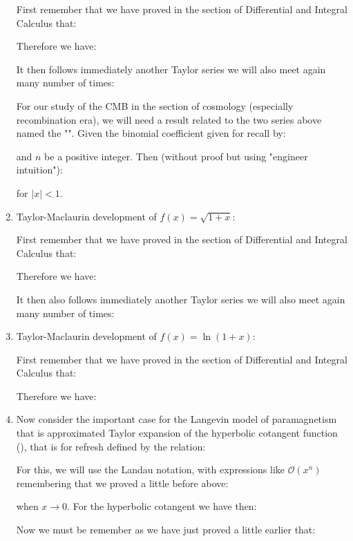 \begin{enumerate}
		First remember that we have proved in the section of Differential and Integral Calculus that:
		
		Therefore we have:
		
		It then follows immediately another Taylor series we will also meet again many  number of times:
		
		For our study of the CMB in the section of cosmology (especially recombination era), we will need a result related to the two series above named the "\label{binomial theorem for negative integer exponents}". Given the binomial coefficient given for recall by:
		
		and $n$ be a positive integer. Then (without proof but using "engineer intuition"):
		
		for $|x|<1$.
		
		\item  Taylor-Maclaurin development of $f(x)=\sqrt{1+x}$:
		
		First remember that we have proved in the section of Differential and Integral Calculus that:
		
		Therefore we have:
		
		It then also follows immediately another Taylor series we will also meet again many  number of times:
		
		
		\item  Taylor-Maclaurin development of $f(x)=\ln(1+x)$\label{maclaurin dev natural logarithm}:
		
		First remember that we have proved in the section of Differential and Integral Calculus that:
		
		Therefore we have:
		
		
		\item  Now consider the important case for the Langevin model of paramagnetism that is approximated Taylor expansion of the hyperbolic cotangent function (), that is for refresh defined by the relation:
		
		For this, we will use the Landau notation, with expressions like $\mathcal{O}(x^n)$ remembering that we proved a little before above:
		
		when $x \rightarrow 0$.
		For the hyperbolic cotangent we have then:
		
		Now we must be remember as we have just proved a little earlier that:
		

\end{enumerate}
